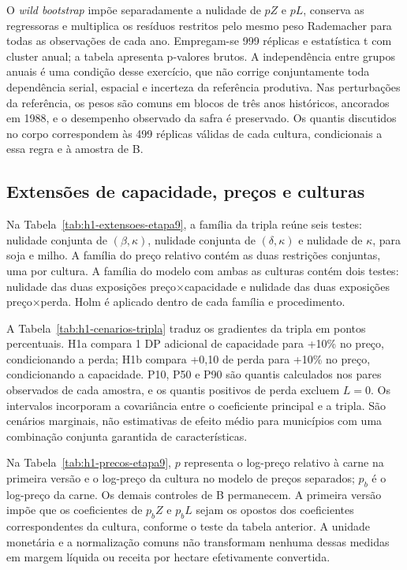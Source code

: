 
\FloatBarrier

O \textit{wild bootstrap} impõe separadamente a nulidade de $pZ$ e $pL$, conserva as regressoras e multiplica os resíduos restritos pelo mesmo peso Rademacher para todas as observações de cada ano. Empregam-se 999 réplicas e estatística t com cluster anual; a tabela apresenta p-valores brutos. A independência entre grupos anuais é uma condição desse exercício, que não corrige conjuntamente toda dependência serial, espacial e incerteza da referência produtiva. Nas perturbações da referência, os pesos são comuns em blocos de três anos históricos, ancorados em 1988, e o desempenho observado da safra é preservado. Os quantis discutidos no corpo correspondem às 499 réplicas válidas de cada cultura, condicionais a essa regra e à amostra de B.

\subsection{Extensões de capacidade, preços e culturas}

Na Tabela~\ref{tab:h1-extensoes-etapa9}, a família da tripla reúne seis testes: nulidade conjunta de $(\beta,\kappa)$, nulidade conjunta de $(\delta,\kappa)$ e nulidade de $\kappa$, para soja e milho. A família do preço relativo contém as duas restrições conjuntas, uma por cultura. A família do modelo com ambas as culturas contém dois testes: nulidade das duas exposições preço×capacidade e nulidade das duas exposições preço×perda. Holm é aplicado dentro de cada família e procedimento.


\FloatBarrier

A Tabela~\ref{tab:h1-cenarios-tripla} traduz os gradientes da tripla em pontos percentuais. H1a compara 1 DP adicional de capacidade para +10\% no preço, condicionando a perda; H1b compara +0,10 de perda para +10\% no preço, condicionando a capacidade. P10, P50 e P90 são quantis calculados nos pares observados de cada amostra, e os quantis positivos de perda excluem $L=0$. Os intervalos incorporam a covariância entre o coeficiente principal e a tripla. São cenários marginais, não estimativas de efeito médio para municípios com uma combinação conjunta garantida de características.


\FloatBarrier

Na Tabela~\ref{tab:h1-precos-etapa9}, $p$ representa o log-preço relativo à carne na primeira versão e o log-preço da cultura no modelo de preços separados; $p_b$ é o log-preço da carne. Os demais controles de B permanecem. A primeira versão impõe que os coeficientes de $p_bZ$ e $p_bL$ sejam os opostos dos coeficientes correspondentes da cultura, conforme o teste da tabela anterior. A unidade monetária e a normalização comuns não transformam nenhuma dessas medidas em margem líquida ou receita por hectare efetivamente convertida.

